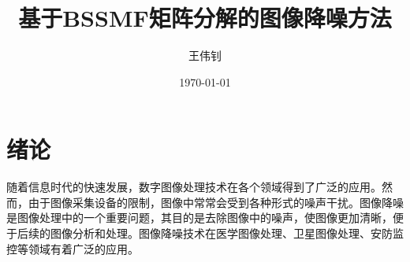 \documentclass[12pt]{article}
\title{基于BSSMF矩阵分解的图像降噪方法}
\author{王伟钊}
\date{\today}
\begin{document}
\maketitle

\begin{abstract}

\end{abstract}

\tableofcontents

\section{绪论}
随着信息时代的快速发展，数字图像处理技术在各个领域得到了广泛的应用。然而，由于图像采集设备的限制，图像中常常会受到各种形式的噪声干扰。图像降噪是图像处理中的一个重要问题，其目的是去除图像中的噪声，使图像更加清晰，便于后续的图像分析和处理。图像降噪技术在医学图像处理、卫星图像处理、安防监控等领域有着广泛的应用。
\end{document}
